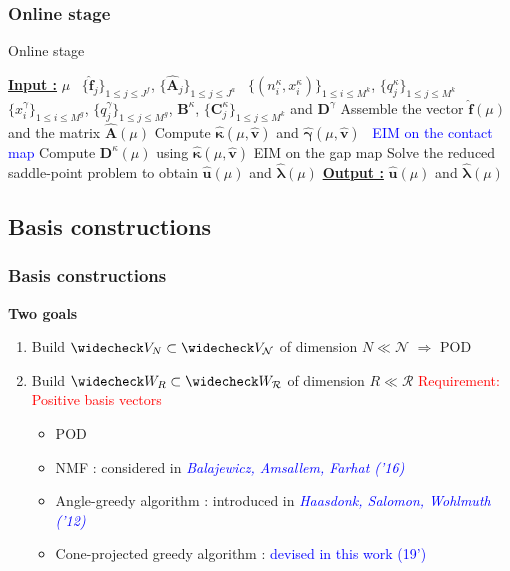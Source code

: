 \documentclass[a4paper,10pt]{beamer}
\newcommand{\cmark}{\ding{51}}%
\newcommand{\xmark}{\ding{55}}%
\newcommand\gr[1]{\textcolor{green} {#1} }
\newcommand\red[1]{\textcolor{red} {#1} }
\newcommand\bl[1]{\textcolor{blue} {#1} }
\newcommand\ma[1]{\textcolor{royalmagenta} {#1} }
\begin{document}
\begin{frame}\frametitle{Online stage}
 \begin{algorithm}[H]
\caption{Online stage}
\begin{algorithmic}[1]
\vspace{0.2cm}
\Statex \textbf{\underline{Input :}}
$\mu $
\Statex \qquad\quad\ $\{\widehat {\mathbf f}_j\}_{1\leq j\leq J^f}$, $\{\widehat {\mathbf A}_j\}_{1\leq j\leq J^a}$
\Statex \qquad\quad\ $\{(n^\kappa_i,x^\kappa_i)\}_{1\leq i \leq M^k}$, 
$\{q^\kappa_j\}_{1\leq j \leq M^k}$
\Statex \qquad\quad\ $\{x^\gamma_i\}_{1\leq i \leq M^g}$,
$\{q^\gamma_j\}_{1\leq j \leq M^g}$, 
$\mathbf B^\kappa$, 
$\{\mathbf C_j^{\kappa}\}_{1\leq j \leq M^k}$ and 
$\mathbf D^\gamma$
\State Assemble the vector $\widehat{\mathbf{f}}(\mu)$ and the matrix $\widehat{\mathbf{A}}(\mu)$ 
\State Compute $\bm{\widehat\kappa}(\mu,\widehat{\mathbf v})$ and $\bm{\widehat\gamma}(\mu,\widehat{\mathbf v})$
\bl{\quad\ EIM on the contact map}
 \State Compute 
$\mathbf D^\kappa(\mu)$ using $\bm{\widehat\kappa}(\mu,\widehat{\mathbf v})$ 
\ma{\quad EIM on the gap map}
\State Solve the reduced saddle-point problem
to obtain $\widehat{\mathbf{u}}(\mu)$ and $\bm{\widehat{\lambda}}(\mu)$
\Statex \textbf{\underline{Output :}}
$\widehat {\mathbf u}(\mu)$ and $\bm{\widehat{\lambda}}(\mu)$
\vspace{0.2cm}
\end{algorithmic}
\end{algorithm}
\end{frame}

\subsection{Basis constructions}
\begin{frame}\frametitle{Basis constructions}
{\bfseries Two goals}
\begin{enumerate}
\item Build $\widecheck V_N \subset \widecheck V_{\mathcal N}$ of dimension $N\ll\mathcal N$\newline 
$\Rightarrow$ POD\gr{\cmark}
\medskip
\item Build $\widecheck W_{R} \subset \widecheck W_{\mathcal R}$ of dimension $R\ll\mathcal R$
\newline \red{Requirement: Positive basis vectors}
\pause
\begin{itemize}
 \item POD\red{\xmark}
 \item NMF\gr{\cmark}:
 considered in {\footnotesize \bl{\textit{Balajewicz, Amsallem, Farhat ('16)}}}
 \item Angle-greedy algorithm\gr{\cmark}:
 introduced in {\footnotesize \bl{\textit{Haasdonk, Salomon, Wohlmuth ('12)}}}
\item Cone-projected greedy algorithm\gr{\cmark\cmark}: \bl{devised in this work (19')}
\end{itemize}
\end{enumerate}
\end{frame}
\end{document}
